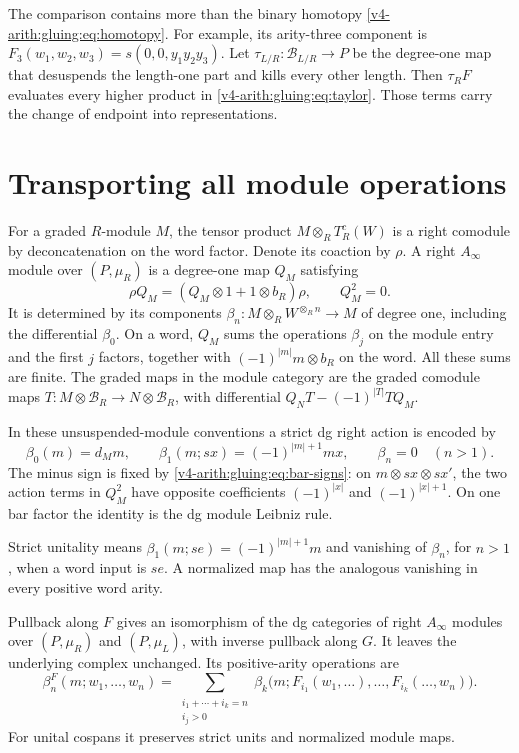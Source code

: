 The comparison contains more than the binary homotopy
\eqref{v4-arith:gluing:eq:homotopy}. For example, its arity-three
component is \(F_3(w_1,w_2,w_3)=s(0,0,y_1y_2y_3)\).
Let \(\tau_{L/R}:\mathcal B_{L/R}\to P\) be the degree-one map
that desuspends the length-one part and kills every other length.
Then \(\tau_RF\) evaluates every higher product in
\eqref{v4-arith:gluing:eq:taylor}. Those terms carry the change of
endpoint into representations.

\section{Transporting all module operations}
\label{v4-arith:gluing:sec:modules}

For a graded \(R\)-module \(M\), the tensor product
\(M\otimes_R T_R^c(W)\) is a right comodule by deconcatenation on the
word factor. Denote its coaction by \(\rho\). A right \(A_\infty\)
module over \((P,\mu_R)\) is a degree-one map \(Q_M\) satisfying
\[
 \rho Q_M=(Q_M\otimes1+1\otimes b_R)\rho,
 \qquad Q_M^2=0.
\]
It is determined by its components
\(\beta_n:M\otimes_R W^{\otimes_R n}\to M\) of degree one, including
the differential \(\beta_0\). On a word, \(Q_M\) sums the operations
\(\beta_j\) on the module entry and the first \(j\) factors, together
with \((-1)^{|m|}m\otimes b_R\) on the word. All these sums are finite.
The graded maps in the module category are the graded comodule maps
\(T:M\otimes\mathcal B_R\to N\otimes\mathcal B_R\), with
differential \(Q_NT-(-1)^{|T|}TQ_M\).

In these unsuspended-module conventions a strict dg right action is
encoded by
\begin{equation}\label{v4-arith:gluing:eq:module-sign}
 \beta_0(m)=d_Mm,\qquad
 \beta_1(m;sx)=(-1)^{|m|+1}mx,\qquad \beta_n=0\quad(n>1).
\end{equation}
The minus sign is fixed by \eqref{v4-arith:gluing:eq:bar-signs}:
on \(m\otimes sx\otimes sx'\), the two action terms in \(Q_M^2\)
have opposite coefficients \((-1)^{|x|}\) and
\((-1)^{|x|+1}\). On one bar factor the identity is the dg module
Leibniz rule.

Strict unitality means \(\beta_1(m;se)=(-1)^{|m|+1}m\) and
vanishing of \(\beta_n\), for \(n>1\), when a word input is \(se\).
A normalized map has the analogous vanishing in every positive
word arity.

\begin{theorem}\label{v4-arith:gluing:thm:modules}
Pullback along \(F\) gives an isomorphism of the dg categories of
right \(A_\infty\) modules over \((P,\mu_R)\) and \((P,\mu_L)\),
with inverse pullback along \(G\). It leaves the underlying complex
unchanged. Its positive-arity operations are
\begin{equation}\label{v4-arith:gluing:eq:module-pullback}
 \beta_n^F(m;w_1,\ldots,w_n)=
 \sum_{\substack{i_1+\cdots+i_k=n\\i_j>0}}
 \beta_k\bigl(m;F_{i_1}(w_1,\ldots),\ldots,
                         F_{i_k}(\ldots,w_n)\bigr).
\end{equation}
For unital cospans it preserves strict units and normalized module maps.
\end{theorem}

